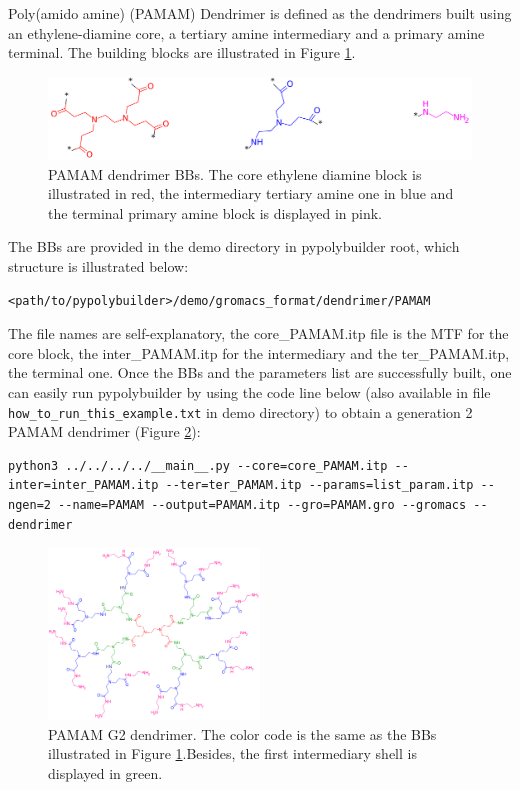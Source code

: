 
Poly(amido amine) (PAMAM) Dendrimer is defined as the dendrimers built using an ethylene-diamine core, a tertiary amine intermediary and a primary amine terminal.
The building blocks are illustrated in Figure \ref{fig:PAMAMBB}.

\begin{figure}
    \centering
    \includegraphics[width=\textwidth]{PAMAM/PAMAMBBs.png}
    \caption{PAMAM dendrimer BBs.
             The core ethylene diamine block is illustrated in red, the intermediary tertiary amine one in blue and the terminal primary amine block is displayed in pink.}
    \label{fig:PAMAMBB}
\end{figure}

The BBs are provided in the demo directory in pypolybuilder root, which structure is illustrated below:
\begin{lstlisting}
<path/to/pypolybuilder>/demo/gromacs_format/dendrimer/PAMAM
\end{lstlisting}

The file names are self-explanatory, the core\_PAMAM.itp file is the MTF for the core block, the inter\_PAMAM.itp for the intermediary and the ter\_PAMAM.itp, the terminal one.
Once the BBs and the parameters list are successfully built, one can easily run pypolybuilder by using the code line below (also available in file \texttt{how\_to\_run\_this\_example.txt} in demo directory) to obtain a generation 2 PAMAM dendrimer (Figure \ref{fig:PAMAMG2}):

\begin{lstlisting}
python3 ../../../../__main__.py --core=core_PAMAM.itp --inter=inter_PAMAM.itp --ter=ter_PAMAM.itp --params=list_param.itp --ngen=2 --name=PAMAM --output=PAMAM.itp --gro=PAMAM.gro --gromacs --dendrimer
\end{lstlisting}

\begin{figure}
    \centering
    \includegraphics[width=0.5\textwidth]{PAMAM/PAMAMG2.png}
    \caption{PAMAM G2 dendrimer. The color code is the same as the BBs illustrated in Figure \ref{fig:PAMAMBB}.Besides, the first intermediary shell is displayed in green.}
    \label{fig:PAMAMG2}
\end{figure}

